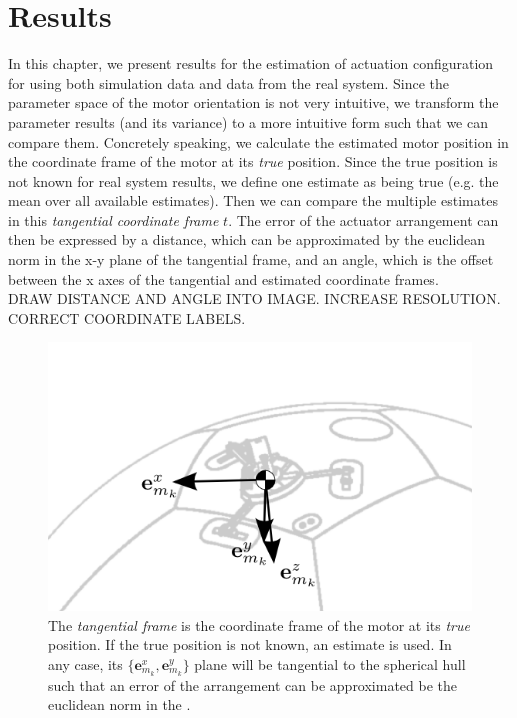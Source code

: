 \chapter{Results}
\label{chap:simulation_results}

In this chapter, we present results for the estimation of actuation configuration for using both simulation data and data from the real system.
Since the parameter space of the motor orientation is not very intuitive, we transform the parameter results (and its variance) to a more intuitive form such that we can compare them.
Concretely speaking, we calculate the estimated motor position in the coordinate frame of the motor at its \textit{true} position.
Since the true position is not known for real system results, we define one estimate as being true (e.g. the mean over all available estimates).
Then we can compare the multiple estimates in this \textit{tangential coordinate frame} $t$.
The error of the actuator arrangement can then be expressed by a distance, which can be approximated by the euclidean norm in the x-y plane of the tangential frame, and an angle, which is the offset between the x axes of the tangential and estimated coordinate frames.
\\
DRAW DISTANCE AND ANGLE INTO IMAGE. INCREASE RESOLUTION. CORRECT COORDINATE LABELS.

\begin{figure}[hbtp]
\centering
\includegraphics[scale=1]{images/tangential_frame.png}
\caption{The \textit{tangential frame} is the coordinate frame of the motor at its \textit{true} position. If the true position is not known, an estimate is used. In any case, its $\lbrace \mathbf{e}^x_{m_k} , \mathbf{e}^y_{m_k} \rbrace$ plane will be tangential to the spherical hull such that an error of the arrangement can be approximated be the euclidean norm in the .}
\label{fig:tangential_frame}
\end{figure}

